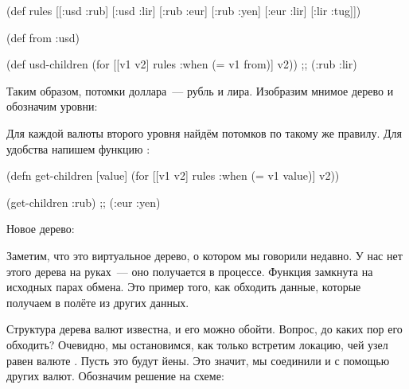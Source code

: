 \begin{english}
  \begin{clojure}
(def rules
  [[:usd :rub]
   [:usd :lir]
   [:rub :eur]
   [:rub :yen]
   [:eur :lir]
   [:lir :tug]])

(def from :usd)

(def usd-children
  (for [[v1 v2] rules
        :when (= v1 from)]
    v2))
;; (:rub :lir)
  \end{clojure}
\end{english}

Таким образом, потомки доллара~--- рубль и лира. Изобразим мнимое дерево и
обозначим уровни:

\begin{figure}[H]
  \centering
  
  \label{fig:chart-zip-14}
\end{figure}

Для каждой валюты второго уровня найдём потомков по такому же правилу. Для
удобства напишем функцию :

\begin{english}
  \begin{clojure}
(defn get-children [value]
  (for [[v1 v2] rules
        :when (= v1 value)]
    v2))

(get-children :rub)
;; (:eur :yen)
  \end{clojure}
\end{english}

Новое дерево:

\begin{figure}[H]
  \centering
  
  \label{fig:chart-zip-15}
\end{figure}

Заметим, что это виртуальное дерево, о котором мы говорили недавно. У нас нет
этого дерева на руках~--- оно получается в процессе. Функция 
замкнута на исходных парах обмена. Это пример того, как обходить данные, которые
получаем в полёте из других данных.

Структура дерева валют известна, и его можно обойти. Вопрос, до каких пор его
обходить? Очевидно, мы остановимся, как только встретим локацию, чей узел равен
валюте . Пусть это будут йены. Это значит, мы соединили  и  с
помощью других валют. Обозначим решение на схеме:

\begin{figure}[H]
  \centering
  
  \label{fig:chart-zip-16}
\end{figure}

